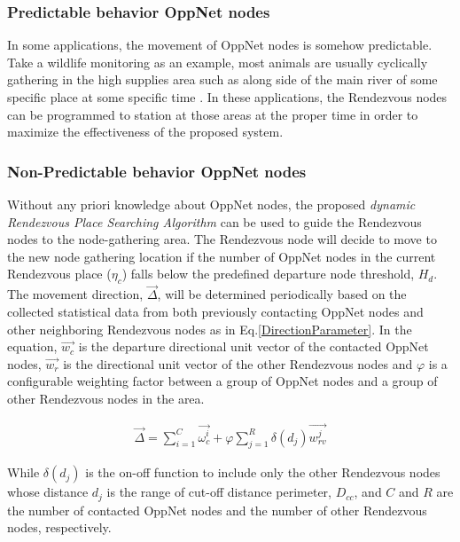 \subsubsection{Predictable behavior OppNet nodes}

In some applications, the movement of OppNet nodes is somehow predictable.
Take a wildlife monitoring as an example, most animals are usually cyclically gathering in the high supplies area such as along side of the main river of some specific place at some specific time \cite{Yu2007}.
%
In these applications, the Rendezvous nodes can be programmed to station at those areas at the proper time in order to maximize the effectiveness of the proposed system.

\subsubsection{Non-Predictable behavior OppNet nodes}

Without any priori knowledge about OppNet nodes, the proposed \emph{dynamic Rendezvous Place Searching Algorithm} can be used to guide the Rendezvous nodes to the node-gathering area.
%
The Rendezvous node will decide to move to the new node gathering location if the number of OppNet nodes in the current Rendezvous place ($\eta_{c}$) falls below the predefined departure node threshold, $H_{d}$.
%
The movement direction, $\vec{\Delta}$, will be determined periodically based on the collected statistical data from both previously contacting OppNet nodes and other neighboring Rendezvous nodes as in Eq.\ref{DirectionParameter}.
%
In the equation, $\vec{w_c}$ is the departure directional unit vector of the contacted OppNet nodes, $\vec{w_r}$ is the directional unit vector of the other Rendezvous nodes and $\varphi$ is a configurable weighting factor between a group of OppNet nodes and a group of other Rendezvous nodes in the area.

\begin{eqnarray}
\label{DirectionParameter}
\vec{\Delta} =\sum _{ i=1 }^{ C }{ \vec { { \omega }_{ c }^{ i } }  } + \varphi \sum _{ j=1 }^{ R }{ \delta\left( d_{j} \right)
	\vec { {w }_{ rv }^{ j } }  }
\end{eqnarray}

While $\delta\left( d_{j} \right)$ is the on-off function to include only the other Rendezvous nodes whose distance $d_j$ is the range of cut-off distance perimeter, $D_{cc}$, and $C$ and $R$ are the number of contacted OppNet nodes and the number of other Rendezvous nodes, respectively.

